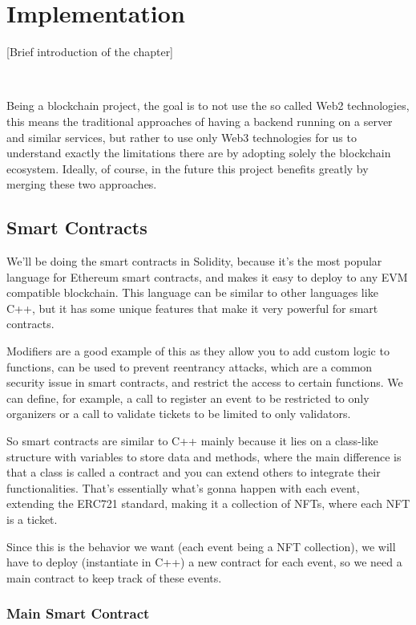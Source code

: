 \chapter{Implementation}
\label{ch:implementation}

[Brief introduction of the chapter]

~

Being a blockchain project, the goal is to not use the so called Web2 technologies, this means the traditional approaches of having a backend running on a server and similar services, but rather to use only Web3 technologies for us to understand exactly the limitations there are by adopting solely the blockchain ecosystem. Ideally, of course, in the future this project benefits greatly by merging these two approaches.

\section{Smart Contracts}

We'll be doing the smart contracts in Solidity, because it's the most popular language for Ethereum smart contracts, and makes it easy to deploy to any EVM compatible blockchain. This language can be similar to other languages like C++, but it has some unique features that make it very powerful for smart contracts.

Modifiers are a good example of this as they allow you to add custom logic to functions, can be used to prevent reentrancy attacks, which are a common security issue in smart contracts, and restrict the access to certain functions. We can define, for example, a call to register an event to be restricted to only organizers or a call to validate tickets to be limited to only validators.

So smart contracts are similar to C++ mainly because it lies on a class-like structure with variables to store data and methods, where the main difference is that a class is called a contract and you can extend others to integrate their functionalities. That's essentially what's gonna happen with each event, extending the ERC721 standard, making it a collection of NFTs, where each NFT is a ticket.

Since this is the behavior we want (each event being a NFT collection), we will have to deploy (instantiate in C++) a new contract for each event, so we need a main contract to keep track of these events.

\subsection{Main Smart Contract}

